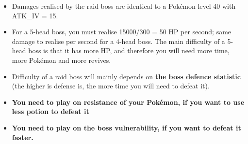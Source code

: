 \documentclass[12pt]{beamer}
\begin{document}
\begin{frame}
\begin{block}{}
\begin{footnotesize}
\begin{itemize}
   \item Damages realised by the raid boss are identical to a Pok\'emon level 40 with ATK\_IV = 15.
  \item For a 5-head boss, you must realise 15000/300 = 50 HP per second; same damage to realise per second for a 4-head boss. The main difficulty of a 5-head boss is that it has more HP, and therefore you will need more time, more Pok\'emon and more revives.
  \item Difficulty of a raid boss will mainly depends on \textbf{the boss defence statistic} (the higher is defense is, the more time you will need to defeat it).
  \item \textbf{You need to play on resistance of your Pok\'emon, if you want to use less potion to defeat it}
  \item \textbf{You need to play on the boss vulnerability, if you want to defeat it faster.}
\end{itemize}

\end{footnotesize}
\end{block}
\end{frame}
\end{document}
